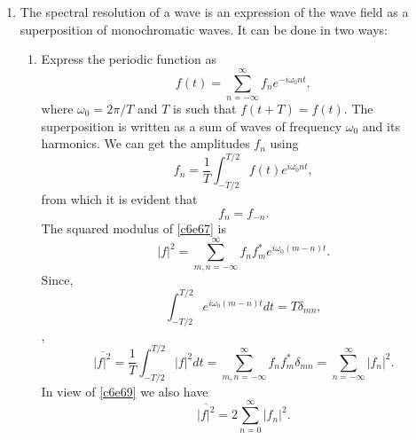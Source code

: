 \begin{enumerate}
\item The spectral resolution of a wave is an expression of the wave field as a
superposition of monochromatic waves. It can be done in two ways:
\begin{enumerate}
\item Express the periodic function as
\begin{equation}\label{c6e67}
f(t) = \sum_{n=-\infty}^\infty f_n e^{-i\omega_0 nt},
\end{equation}
where $\omega_0 = 2\pi/T$ and $T$ is such that $f(t + T) = f(t)$. The superposition
is written as a sum of waves of frequency $\omega_0$ and its harmonics. We can 
get the amplitudes $f_n$ using
\begin{equation}\label{c6e68}
f_n = \frac{1}{T}\int_{-T/2}^{T/2} f(t)e^{i\omega_0 nt},
\end{equation}
from which it is evident that
\begin{equation}\label{c6e69}
f_n = f_{-n}.
\end{equation}
The squared modulus of \eqref{c6e67} is
\begin{equation}\label{c6e70}
|f|^2 = \sum_{m, n = -\infty}^\infty f_n f_m^\ast e^{i\omega_0(m - n)t}.
\end{equation}
Since,
\begin{equation}\label{c6e71}
\int_{-T/2}^{T/2}e^{i\omega_0(m - n)t}dt = T\delta_{mn},
\end{equation},
\begin{equation}\label{c6e71a}
\overline{|f|^2} = \frac{1}{T}\int_{-T/2}^{T/2}|f|^2 dt = 
\sum_{m, n = -\infty}^\infty f_n f_m^\ast \delta_{mn} = 
\sum_{n=-\infty}^\infty |f_n|^2.
\end{equation}
In view of \eqref{c6e69} we also have
\begin{equation}\label{c6e72}
\overline{|f|^2} = 2\sum_{n=0}^\infty |f_n|^2.
\end{equation}


\end{enumerate}
\end{enumerate}
